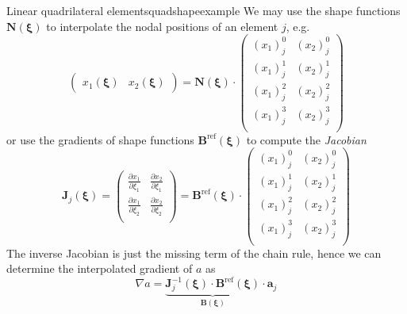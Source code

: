 \begin{example}{Linear quadrilateral elements}{quadshapeexample}
    We may use the shape functions $\mathbf{N}(\pmb{\xi})$ to interpolate the nodal positions of an element $j$, e.g. 
    \begin{equation}
        \begin{pmatrix}
            x_1(\pmb{\xi}) &  x_2(\pmb{\xi})
        \end{pmatrix}
        = 
        \mathbf{N}(\pmb{\xi})
        \cdot 
        \begin{pmatrix}
            {(x_1)}_j^0 &  {(x_2)}_j^0 \\
            {(x_1)}_j^1 &  {(x_2)}_j^1 \\
            {(x_1)}_j^2 &  {(x_2)}_j^2 \\
            {(x_1)}_j^3 &  {(x_2)}_j^3 \\
        \end{pmatrix}
    \end{equation}
    or use the gradients of shape functions $\mathbf{B}^\textrm{ref}(\pmb{\xi})$ to compute the \emph{Jacobian} 
    \begin{equation}
        \mathbf{J}_j(\pmb{\xi})
        = 
        \begin{pmatrix}
            \frac{\partial x_1}{\partial \xi_1} & \frac{\partial x_2}{\partial \xi_1} \\
            \frac{\partial x_1}{\partial \xi_2} & \frac{\partial x_2}{\partial \xi_2} \\
        \end{pmatrix}
        = 
        \mathbf{B}^\textrm{ref}(\pmb{\xi})
        \cdot 
        \begin{pmatrix}
            {(x_1)}_j^0 &  {(x_2)}_j^0 \\
            {(x_1)}_j^1 &  {(x_2)}_j^1 \\
            {(x_1)}_j^2 &  {(x_2)}_j^2 \\
            {(x_1)}_j^3 &  {(x_2)}_j^3 \\
        \end{pmatrix}
    \end{equation}
    The inverse Jacobian is just the missing term of the chain rule, hence we can determine the interpolated gradient of $a$ as 
    \begin{equation}
        \nabla a = 
        \underbrace{
            \mathbf{J}_j^{-1}(\pmb{\xi}) 
            \cdot 
            \mathbf{B}^\textrm{ref}(\pmb{\xi})
            }_{\mathbf{B}(\pmb{\xi})}
        \cdot  \mathbf{a}_j
    \end{equation}
\end{example}

